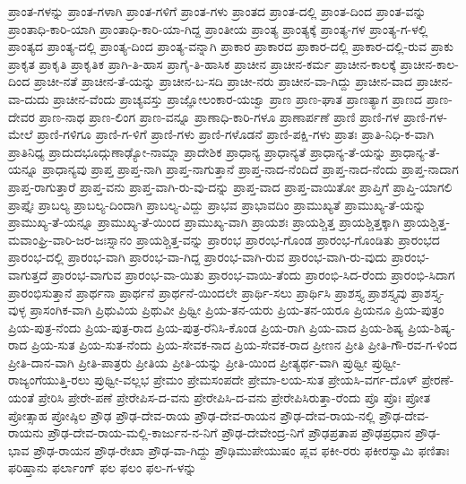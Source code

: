 ಪ್ರಾಂತ-ಗಳನ್ನು
ಪ್ರಾಂತ-ಗಳಾಗಿ
ಪ್ರಾಂತ-ಗಳಿಗೆ
ಪ್ರಾಂತ-ಗಳು
ಪ್ರಾಂತದ
ಪ್ರಾಂತ-ದಲ್ಲಿ
ಪ್ರಾಂತ-ದಿಂದ
ಪ್ರಾಂತ-ವನ್ನು
ಪ್ರಾಂತಾಧಿ-ಕಾರಿ-ಯಾಗಿ
ಪ್ರಾಂತಾಧಿ-ಕಾರಿ-ಯಾ-ಗಿದ್ದ
ಪ್ರಾಂತೀಯ
ಪ್ರಾಂತ್ಯ
ಪ್ರಾಂತ್ಯಕ್ಕೆ
ಪ್ರಾಂತ್ಯ-ಗಳ
ಪ್ರಾಂತ್ಯ-ಗ-ಳಲ್ಲಿ
ಪ್ರಾಂತ್ಯದ
ಪ್ರಾಂತ್ಯ-ದಲ್ಲಿ
ಪ್ರಾಂತ್ಯ-ದಿಂದ
ಪ್ರಾಂತ್ಯ-ವನ್ನಾಗಿ
ಪ್ರಾಕಾರ
ಪ್ರಾಕಾರದ
ಪ್ರಾಕಾರ-ದಲ್ಲಿ
ಪ್ರಾಕಾರ-ದಲ್ಲಿ-ರುವ
ಪ್ರಾಕು
ಪ್ರಾಕೃತ
ಪ್ರಾಕೃತಿ
ಪ್ರಾಕೃತಿಕ
ಪ್ರಾಗಿ-ತಿ-ಹಾಸ
ಪ್ರಾಗೈ-ತಿ-ಹಾಸಿಕ
ಪ್ರಾಚೀನ
ಪ್ರಾಚೀನ-ಕರ್ಮ
ಪ್ರಾಚೀನ-ಕಾಲಕ್ಕೆ
ಪ್ರಾಚೀನ-ಕಾಲ-ದಿಂದ
ಪ್ರಾಚೀ-ನತೆ
ಪ್ರಾಚೀನ-ತೆ-ಯನ್ನು
ಪ್ರಾಚೀನ-ಬ-ಸದಿ
ಪ್ರಾಚೀ-ನರು
ಪ್ರಾಚೀನ-ವಾ-ಗಿದ್ದು
ಪ್ರಾಚೀನ-ವಾದ
ಪ್ರಾಚೀನ-ವಾ-ದುದು
ಪ್ರಾಚೀನ-ವೆಂದು
ಪ್ರಾಚ್ಯವಸ್ತು
ಪ್ರಾಜ್ಞೋಲಂಕಾರ-ಯಜ್ವಾ
ಪ್ರಾಣ
ಪ್ರಾಣ-ಘಾತ
ಪ್ರಾಣತ್ಯಾಗ
ಪ್ರಾಣದ
ಪ್ರಾಣ-ದೇವರ
ಪ್ರಾಣ-ನಾಥ
ಪ್ರಾಣ-ಲಿಂಗ
ಪ್ರಾಣ-ವನ್ನೂ
ಪ್ರಾಣಾಧಿ-ಕಾರಿ-ಗಳೂ
ಪ್ರಾಣಾರ್ಪಣೆ
ಪ್ರಾಣಿ
ಪ್ರಾಣಿ-ಗಳ
ಪ್ರಾಣಿ-ಗಳ-ಮೇಲೆ
ಪ್ರಾಣಿ-ಗಳಿಗೂ
ಪ್ರಾಣಿ-ಗ-ಳಿಗೆ
ಪ್ರಾಣಿ-ಗಳು
ಪ್ರಾಣಿ-ಗಳೊಡನೆ
ಪ್ರಾಣಿ-ಪಕ್ಷಿ-ಗಳು
ಪ್ರಾತಃ
ಪ್ರಾತಿ-ನಿಧಿ-ಕ-ವಾಗಿ
ಪ್ರಾತಿನಿಧ್ಯ
ಪ್ರಾದುದಭೂದ್ಗುಣಾಢ್ಯೋ-ನಾಮ್ನಾ
ಪ್ರಾದೇಶಿಕ
ಪ್ರಾಧಾನ್ಯ
ಪ್ರಾಧಾನ್ಯತೆ
ಪ್ರಾಧಾನ್ಯ-ತೆ-ಯನ್ನು
ಪ್ರಾಧಾನ್ಯ-ತೆ-ಯನ್ನೂ
ಪ್ರಾಧಾನ್ಯವು
ಪ್ರಾಪ್ತ
ಪ್ರಾಪ್ತ-ನಾಗಿ
ಪ್ರಾಪ್ತ-ನಾಗುತ್ತಾನೆ
ಪ್ರಾಪ್ತ-ನಾದ-ನೆಂದಿದೆ
ಪ್ರಾಪ್ತ-ನಾದ-ನೆಂದು
ಪ್ರಾಪ್ತ-ನಾದಾಗ
ಪ್ರಾಪ್ತ-ರಾಗುತ್ತಾರೆ
ಪ್ರಾಪ್ತ-ವನು
ಪ್ರಾಪ್ತ-ವಾಗಿ-ರು-ವು-ದನ್ನು
ಪ್ರಾಪ್ತ-ವಾದ
ಪ್ರಾಪ್ತ-ವಾಯಿತೋ
ಪ್ರಾಪ್ತಿಗೆ
ಪ್ರಾಪ್ತಿ-ಯಾಗಲಿ
ಪ್ರಾಪ್ತೈಃ
ಪ್ರಾಬಲ್ಯ
ಪ್ರಾಬಲ್ಯ-ದಿಂದಾಗಿ
ಪ್ರಾಬಲ್ಯ-ವಿದ್ದು
ಪ್ರಾಭವ
ಪ್ರಾಭಾವದಿಂ
ಪ್ರಾಮುಖ್ಯತೆ
ಪ್ರಾಮುಖ್ಯ-ತೆ-ಯನ್ನು
ಪ್ರಾಮುಖ್ಯ-ತೆ-ಯನ್ನೂ
ಪ್ರಾಮುಖ್ಯ-ತೆ-ಯಿಂದ
ಪ್ರಾಮುಖ್ಯ-ವಾಗಿ
ಪ್ರಾಯಶಃ
ಪ್ರಾಯಶ್ಚಿತ್ತ
ಪ್ರಾಯಶ್ಚಿತ್ತಕ್ಕಾಗಿ
ಪ್ರಾಯಶ್ಚಿತ್ತ-ಮವಾಂಘ್ರಿ-ವಾರಿ-ಜರ-ಜಃಸ್ನಾನಂ
ಪ್ರಾಯಶ್ಚಿತ್ತ-ವನ್ನು
ಪ್ರಾರಂಭ
ಪ್ರಾರಂಭ-ಗೊಂಡ
ಪ್ರಾರಂಭ-ಗೊಂಡಿತು
ಪ್ರಾರಂಭದ
ಪ್ರಾರಂಭ-ದಲ್ಲಿ
ಪ್ರಾರಂಭ-ವಾಗಿ
ಪ್ರಾರಂಭ-ವಾ-ಗಿದ್ದ
ಪ್ರಾರಂಭ-ವಾಗಿ-ರುವ
ಪ್ರಾರಂಭ-ವಾಗಿ-ರು-ವುದು
ಪ್ರಾರಂಭ-ವಾಗುತ್ತದೆ
ಪ್ರಾರಂಭ-ವಾಗುವ
ಪ್ರಾರಂಭ-ವಾ-ಯಿತು
ಪ್ರಾರಂಭ-ವಾಯಿ-ತೆಂದು
ಪ್ರಾರಂಭಿ-ಸಿದ-ರೆಂದು
ಪ್ರಾರಂಭಿ-ಸಿದಾಗ
ಪ್ರಾರಂಭಿಸುತ್ತಾನೆ
ಪ್ರಾರ್ಥನಾ
ಪ್ರಾರ್ಥನೆ
ಪ್ರಾರ್ಥನೆ-ಯಿಂದಲೇ
ಪ್ರಾರ್ಥಿ-ಸಲು
ಪ್ರಾರ್ಥಿಸಿ
ಪ್ರಾಶಸ್ತ್ಯ
ಪ್ರಾಶಸ್ತ್ಯವು
ಪ್ರಾಶಸ್ತ್ಯ-ವುಳ್ಳ
ಪ್ರಾಸಂಗಿಕ-ವಾಗಿ
ಪ್ರಿಥುವಿಯ
ಪ್ರಿಥುವೀ
ಪ್ರಿಥ್ವೀ
ಪ್ರಿಯ-ತನ-ಯರು
ಪ್ರಿಯ-ತನ-ಯರೂ
ಪ್ರಿಯನೂ
ಪ್ರಿಯ-ಪುತ್ರಂ
ಪ್ರಿಯ-ಪುತ್ರ-ನೆಂದು
ಪ್ರಿಯ-ಪುತ್ರ-ರಾದ
ಪ್ರಿಯ-ಪುತ್ರ-ರೆನಿಸಿ-ಕೊಂಡ
ಪ್ರಿಯ-ರಾಗಿ
ಪ್ರಿಯ-ವಾದ
ಪ್ರಿಯ-ಶಿಷ್ಯ
ಪ್ರಿಯ-ಶಿಷ್ಯ-ರಾದ
ಪ್ರಿಯ-ಸುತ
ಪ್ರಿಯ-ಸುತ-ನೆಂದು
ಪ್ರಿಯ-ಸೇವಕ-ನಾದ
ಪ್ರಿಯ-ಸೇವಕ-ರಾದ
ಪ್ರೀಣನ
ಪ್ರೀತಿ
ಪ್ರೀತಿ-ಗೌ-ರವ-ಗ-ಳಿಂದ
ಪ್ರೀತಿ-ದಾನ-ವಾಗಿ
ಪ್ರೀತಿ-ಪಾತ್ರರು
ಪ್ರೀತಿಯ
ಪ್ರೀತಿ-ಯನ್ನು
ಪ್ರೀತಿ-ಯಿಂದ
ಪ್ರೀತ್ಯರ್ಥ-ವಾಗಿ
ಪ್ರುಥ್ವೀ
ಪ್ರುಥ್ವೀ-ರಾಜ್ಯಂಗೆಯುತ್ತಿ-ರಲು
ಪ್ರುಥ್ವೀ-ವಲ್ಲಭ
ಪ್ರೇಮಂ
ಪ್ರೇಮಸಂಪದೇ
ಪ್ರೇಮಾ-ಲಯ-ಸುತ
ಪ್ರೇಯಸಿ-ವರ್ಗ-ದೊಳ್
ಪ್ರೇರಣೆ-ಯಂತೆ
ಪ್ರೇರಿಸಿ
ಪ್ರೇರೇ-ಪಣೆ
ಪ್ರೇರೇಪಿಸ-ದ-ವನು
ಪ್ರೇರೇಪಿಸಿ-ದ-ವನು
ಪ್ರೇರೇಪಿಸಿರುತ್ತಾ-ರೆಂದು
ಪ್ರೊ
ಪ್ರೊಃ
ಪ್ರೋತ
ಪ್ರೋತ್ಸಾಹ
ಪ್ರೋಷ್ಠಿಲ
ಪ್ರೌಢ
ಪ್ರೌಢ-ದೇವ-ರಾಯ
ಪ್ರೌಢ-ದೇವ-ರಾಯನ
ಪ್ರೌಢ-ದೇವ-ರಾಯ-ನಲ್ಲಿ
ಪ್ರೌಢ-ದೇವ-ರಾಯನು
ಪ್ರೌಢ-ದೇವ-ರಾಯ-ಮಲ್ಲಿ-ಕಾರ್ಜುನ-ನ-ನಿಗೆ
ಪ್ರೌಢ-ದೇವೇಂದ್ರ-ನಿಗೆ
ಪ್ರೌಢಪ್ರತಾಪ
ಪ್ರೌಢಪ್ರಧಾನ
ಪ್ರೌಢ-ಭಾವ
ಪ್ರೌಢ-ರಾಯನ
ಪ್ರೌಢ-ರೇಖಾ
ಪ್ರೌಢ-ವಾ-ಗಿದ್ದು
ಪ್ರೌಢಿಮುಪೇಯುಷಂ
ಪ್ಲವ
ಫಕೀ-ರರು
ಫಕೀರಸ್ವಾಮಿ
ಫಣಿತಾಃ
ಫರಿಷ್ತಾನು
ಫರ್ಲಾಂಗ್
ಫಲ
ಫಲಂ
ಫಲ-ಗ-ಳನ್ನು
